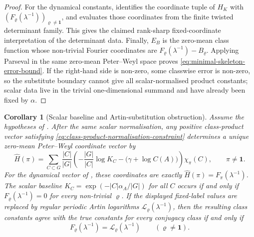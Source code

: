 \documentclass[11pt,a4paper]{amsart}
\theoremstyle{plain}
\newtheorem{corollary}[theorem]{Corollary}
\theoremstyle{definition}
\theoremstyle{remark}
\begin{document}
\begin{proof}
  For the dynamical constants, 
  identifies the coordinate tuple of \(H_K\) with
  \((F_\varrho(\lambda^{-1}))_{\varrho\ne\mathbf1}\), and
   evaluates those coordinates
  from the finite twisted determinant family.  This gives the claimed
  rank-sharp fixed-coordinate interpretation of the determinant data.  Finally,
  \(E_B\) is the zero-mean class function whose non-trivial Fourier
  coordinates are
  \(F_\varrho(\lambda^{-1})-B_\varrho\).  Applying Parseval in the same
  zero-mean Peter--Weyl space proves
  \eqref{eq:minimal-skeleton-error-bound}.  If the right-hand side is
  non-zero, some classwise error is non-zero, so the substitute boundary
  cannot give all scalar-normalised product constants; scalar data live in
  the trivial one-dimensional summand and have already been fixed by
  \(\alpha\).
\end{proof}

\begin{corollary}[Scalar baseline and Artin-substitution obstruction]
  \label{cor:class-product-artin-obstruction-recovery}
  \label{cor:class-product-artin-obstruction-readout}
  Assume the hypotheses of .  After the
  same scalar normalisation, any positive class-product vector satisfying
  \eqref{eq:class-product-normalisation-constraint} determines a unique
  zero-mean Peter--Weyl coordinate vector by
  \[
    \widehat H(\pi)
    =
    \sum_{C\subset G}\frac{|C|}{|G|}
      \left(-\frac{|G|}{|C|}\log K_C-\bigl(\gamma+\log C(A)\bigr)
      \right)\chi_\pi(C),
    \qquad \pi\ne\mathbf1 .
  \]
  For the dynamical vector of , these
  coordinates are exactly
  \(\widehat H(\pi)=F_\pi(\lambda^{-1})\).  The scalar baseline
  \(K_C=\exp(-|C|\alpha_A/|G|)\) for all \(C\) occurs if and only if
  \(F_\varrho(\lambda^{-1})=0\) for every non-trivial \(\varrho\).  If the
  displayed fixed-label values are replaced by regular periodic Artin
  logarithms \(\mathcal L_\varrho(\lambda^{-1})\), then the resulting class
  constants agree with the true constants for every conjugacy class if and
  only if
  \[
    F_\varrho(\lambda^{-1})=
    \mathcal L_\varrho(\lambda^{-1})
    \qquad(\varrho\ne\mathbf1).
  \]
\end{corollary}
\end{document}

